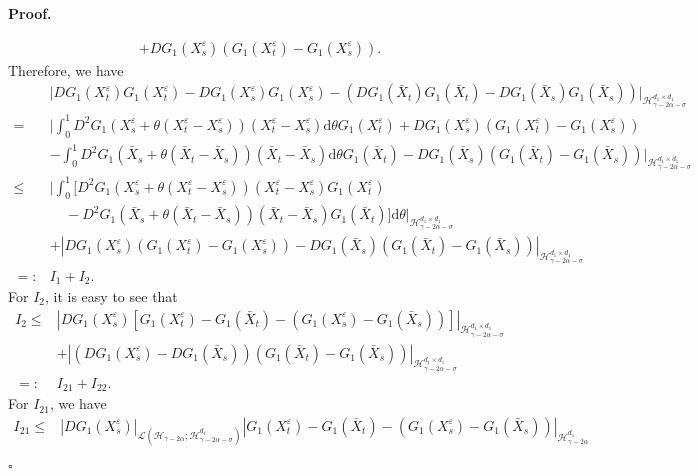 \documentclass[10pt,a4paper]{article}
\numberwithin{equation}{section}
\newenvironment{proof}[1][\normalfont\bfseries Proof]{%
	\noindent #1.\hspace{0.5em}%
	\ignorespaces%
}{%
	\hfill $\square$%
	\par%
}
\begin{document}
\begin{proof}
\begin{align*}
		+DG_1(X_s^\varepsilon)(G_1(X_t^\varepsilon)-G_1(X_s^\varepsilon)).
	\end{align*}
	Therefore, we have
	\begin{align*}
		&\big|DG_1(X_t^\varepsilon)G_1(X_t^\varepsilon)-DG_1(X_s^\varepsilon)G_1(X_s^\varepsilon)-(DG_1(\bar{X}_t)G_1(\bar{X}_t)-DG_1(\bar{X}_s)G_1(\bar{X}_s)) \big|_{\mathcal H_{\gamma-2\alpha-\sigma}^{d_1 \times d_1}}	 \nonumber\\
		=& \bigg| \int_0^1 D^2 G_1 (X_s^\varepsilon+\theta(X_t^\varepsilon-X_s^\varepsilon)) (X_t^\varepsilon-X_s^\varepsilon) \mathrm{d} \theta G_1(X_t^\varepsilon)
		+DG_1(X_s^\varepsilon)(G_1(X_t^\varepsilon)-G_1(X_s^\varepsilon)) \nonumber\\
		&-\int_0^1 D^2 G_1(\bar{X}_s+\theta(\bar{X}_t-\bar{X}_s)) (\bar{X}_t-\bar{X}_s)  \mathrm{d} \theta G_1(\bar{X}_t)
		-DG_1(\bar{X}_s)(G_1(\bar{X}_t)-G_1(\bar{X}_s)) \bigg|_{\mathcal H_{\gamma-2\alpha-\sigma}^{d_1 \times d_1} } \nonumber\\
		\leq & \bigg| \int_0^1 \big[D^2 G_1 (X_s^\varepsilon+\theta(X_t^\varepsilon-X_s^\varepsilon)) (X_t^\varepsilon-X_s^\varepsilon)G_1(X_t^\varepsilon)\\
&~~~~~-D^2 G_1(\bar{X}_s+\theta(\bar{X}_t-\bar{X}_s)) (\bar{X}_t-\bar{X}_s) G_1(\bar{X}_t) \big] \mathrm{d} \theta \bigg|_{\mathcal H_{\gamma-2\alpha-\sigma}^{d_1 \times d_1} } \nonumber\\
		&+|DG_1(X_s^\varepsilon)(G_1(X_t^\varepsilon)-G_1(X_s^\varepsilon))-DG_1(\bar{X}_s)(G_1(\bar{X}_t)-G_1(\bar{X}_s))|_{\mathcal H_{\gamma-2\alpha-\sigma}^{d_1 \times d_1} }  \nonumber\\
		=:&I_1+I_2.
	\end{align*}
	For $I_2$, it is easy to see that
	\begin{align*}
		I_2 \leq & \left|DG_1(X_s^\varepsilon)[G_1(X_t^\varepsilon)-G_1(\bar{X}_t)-(G_1(X_s^\varepsilon)-G_1(\bar{X}_s) )]  \right|_{\mathcal H_{\gamma-2\alpha-\sigma}^{d_1 \times d_1} }  \nonumber\\
		&+\left|(DG_1(X_s^\varepsilon)-DG_1(\bar{X}_s)) (G_1(\bar{X}_t)-G_1(\bar{X}_s))  \right|_{\mathcal H_{\gamma-2\alpha-\sigma}^{d_1 \times d_1} } \nonumber\\
		=:& I_{21}+I_{22}.
	\end{align*}
	For $I_{21}$, we have
	\begin{align}\label{I21}
		I_{21} \leq &|DG_1(X_s^\varepsilon)|_{\mathcal L(\mathcal H_{\gamma-2\alpha}; \mathcal H_{\gamma-2\alpha-\sigma}^{d_1 } )}
		|G_1(X_t^\varepsilon)-G_1(\bar{X}_t)-(G_1(X_s^\varepsilon)-G_1(\bar{X}_s) )|_{\mathcal H_{\gamma-2\alpha}^{d_1}} \nonumber\\

\end{align}
\end{proof}
\end{document}
